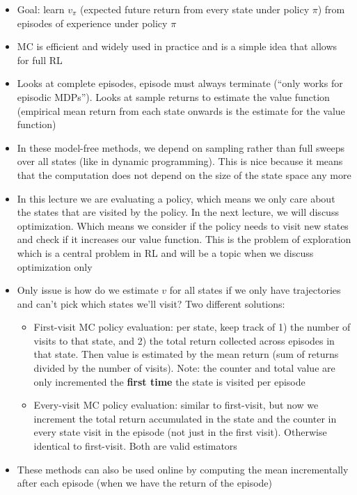 \documentclass{article}
\begin{document}
\begin{itemize}
    \item Goal: learn $v_\pi$ (expected future return from every state under policy $\pi$) from episodes of experience under policy $\pi$ 
    \item MC is efficient and widely used in practice and is a simple idea that allows for full RL
    \item Looks at complete episodes, episode must always terminate (``only works for episodic MDPs''). Looks at sample returns to estimate the value function (empirical mean return from each state onwards is the estimate for the value function)
    \item In these model-free methods, we depend on sampling rather than full sweeps over all states (like in dynamic programming). This is nice because it means that the computation does not depend on the size of the state space any more
    \item In this lecture we are evaluating a policy, which means we only care about the states that are visited by the policy. In the next lecture, we will discuss optimization. Which means we consider if the policy needs to visit new states and check if it increases our value function. This is the problem of exploration which is a central problem in RL and will be a topic when we discuss optimization only
    \item Only issue is how do we estimate $v$ for all states if we only have trajectories and can't pick which states we'll visit? Two different solutions:
    \begin{itemize}
        \item First-visit MC policy evaluation: per state, keep track of 1) the number of visits to that state, and 2) the total return collected across episodes in that state. Then value is estimated by the mean return (sum of returns divided by the number of visits). Note: the counter and total value are only incremented the \textbf{first time} the state is visited per episode
        \item Every-visit MC policy evaluation: similar to first-visit, but now we increment the total return accumulated in the state and the counter in every state visit in the episode (not just in the first visit). Otherwise identical to first-visit. Both are valid estimators
    \end{itemize}
    \item These methods can also be used online by computing the mean incrementally after each episode (when we have the return of the episode)

\end{itemize}
\end{document}
